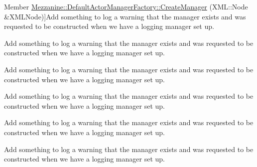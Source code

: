 \begin{DoxyRefList}
\hypertarget{todo__todo000003}{}%
Member \hyperlink{classMezzanine_1_1DefaultActorManagerFactory_a0677fb6f2d51af8ec6316e54a3e3b90e}{Mezzanine\-:\-:Default\-Actor\-Manager\-Factory\-:\-:Create\-Manager} (X\-M\-L\-::\-Node \&X\-M\-L\-Node)]Add something to log a warning that the manager exists and was requested to be constructed when we have a logging manager set up.  
\item[\label{todo__todo000009}%
\hypertarget{todo__todo000009}{}%
Member \hyperlink{classMezzanine_1_1DefaultAudioManagerFactory_a083a7548bd1d6d6b06952829604d174a}{Mezzanine\-:\-:Default\-Audio\-Manager\-Factory\-:\-:Create\-Manager} (Name\-Value\-Pair\-List \&Params)]Add something to log a warning that the manager exists and was requested to be constructed when we have a logging manager set up.  
\item[\label{todo__todo000010}%
\hypertarget{todo__todo000010}{}%
Member \hyperlink{classMezzanine_1_1DefaultAudioManagerFactory_a4dd9d443d94e468643119e2fb1893ea2}{Mezzanine\-:\-:Default\-Audio\-Manager\-Factory\-:\-:Create\-Manager} (X\-M\-L\-::\-Node \&X\-M\-L\-Node)]Add something to log a warning that the manager exists and was requested to be constructed when we have a logging manager set up.  
\item[\label{todo__todo000015}%
\hypertarget{todo__todo000015}{}%
Member \hyperlink{classMezzanine_1_1DefaultCameraManagerFactory_adf79601857c8faff305e0fd9b282dbaf}{Mezzanine\-:\-:Default\-Camera\-Manager\-Factory\-:\-:Create\-Manager} (X\-M\-L\-::\-Node \&X\-M\-L\-Node)]Add something to log a warning that the manager exists and was requested to be constructed when we have a logging manager set up.  
\item[\label{todo__todo000014}%
\hypertarget{todo__todo000014}{}%
Member \hyperlink{classMezzanine_1_1DefaultCameraManagerFactory_a36f97fcfe2ac3b4b71be3f93a026f7e1}{Mezzanine\-:\-:Default\-Camera\-Manager\-Factory\-:\-:Create\-Manager} (Name\-Value\-Pair\-List \&Params)]Add something to log a warning that the manager exists and was requested to be constructed when we have a logging manager set up.  
\item[\label{todo__todo000017}%
\hypertarget{todo__todo000017}{}%
Member \hyperlink{classMezzanine_1_1DefaultCollisionShapeManagerFactory_a52b64a79bcbba0637463e0904b38587b}{Mezzanine\-:\-:Default\-Collision\-Shape\-Manager\-Factory\-:\-:Create\-Manager} (Name\-Value\-Pair\-List \&Params)]Add something to log a warning that the manager exists and was requested to be constructed when we have a logging manager set up.  

\end{DoxyRefList}
